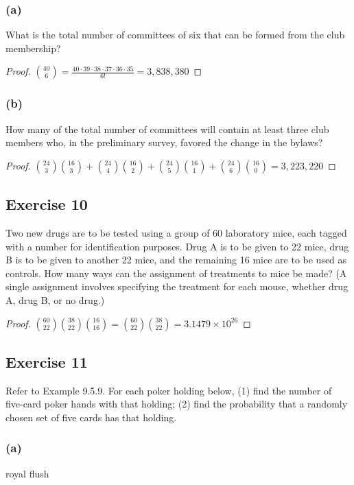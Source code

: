 \documentclass[14pt]{extarticle}
\begin{document}
\subsubsection{(a)}
What is the total number of committees of six that can be formed from the club membership?

\begin{proof}
     \(\binom{40}{6} = \frac{40 \cdot 39 \cdot 38 \cdot 37 \cdot 36 \cdot 35}{6!} = 3,838,380\)
\end{proof}

\subsubsection{(b)}
How many of the total number of committees will contain at least three club members who, in the preliminary survey,
favored the change in the bylaws?

\begin{proof}
     \(\binom{24}{3}\binom{16}{3} + \binom{24}{4}\binom{16}{2} + \binom{24}{5}\binom{16}{1} + \binom{24}{6}\binom{16}{0} =
     3,223,220\)
\end{proof}

\subsection{Exercise 10}
Two new drugs are to be tested using a group of 60 laboratory mice, each tagged with a number for identification purposes.
Drug A is to be given to 22 mice, drug B is to be given to another 22 mice, and the remaining 16 mice are to be used as
controls. How many ways can the assignment of treatments to mice be made? (A single assignment involves specifying the
treatment for each mouse, whether drug A, drug B, or no drug.)

\begin{proof}
     \(\binom{60}{22}\binom{38}{22}\binom{16}{16} = \binom{60}{22}\binom{38}{22} = 3.1479 \times 10^{26}\)
\end{proof}

\subsection{Exercise 11}
Refer to Example 9.5.9. For each poker holding below, (1) find the number of five-card poker hands with that holding;
(2) find the probability that a randomly chosen set of five cards has that holding.

\subsubsection{(a)}
royal flush
\end{document}
